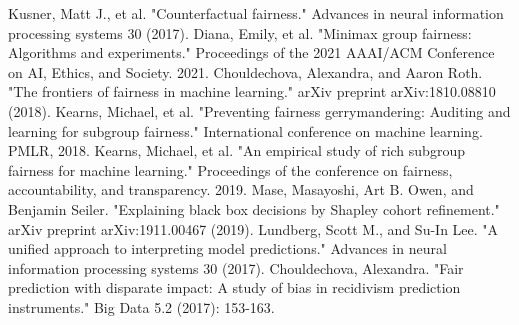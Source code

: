 \documentclass[conference]{IEEEtran}
\begin{document}
\begin{thebibliography}{9}
Kusner, Matt J., et al. "Counterfactual fairness." Advances in neural information processing systems 30 (2017).
Diana, Emily, et al. "Minimax group fairness: Algorithms and experiments." Proceedings of the 2021 AAAI/ACM Conference on AI, Ethics, and Society. 2021.
Chouldechova, Alexandra, and Aaron Roth. "The frontiers of fairness in machine learning." arXiv preprint arXiv:1810.08810 (2018).
Kearns, Michael, et al. "Preventing fairness gerrymandering: Auditing and learning for subgroup fairness." International conference on machine learning. PMLR, 2018.
Kearns, Michael, et al. "An empirical study of rich subgroup fairness for machine learning." Proceedings of the conference on fairness, accountability, and transparency. 2019.
Mase, Masayoshi, Art B. Owen, and Benjamin Seiler. "Explaining black box decisions by Shapley cohort refinement." arXiv preprint arXiv:1911.00467 (2019).
Lundberg, Scott M., and Su-In Lee. "A unified approach to interpreting model predictions." Advances in neural information processing systems 30 (2017).
Chouldechova, Alexandra. "Fair prediction with disparate impact: A study of bias in recidivism prediction instruments." Big Data 5.2 (2017): 153-163.
\end{thebibliography}
\end{document}
